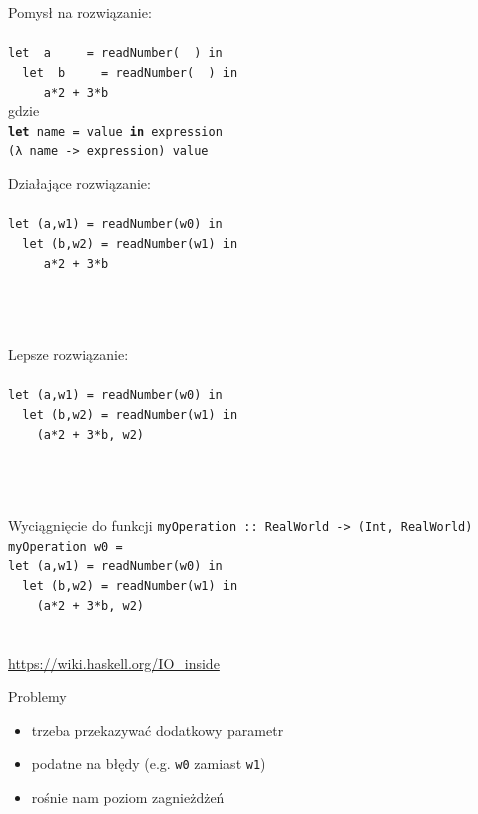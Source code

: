 \documentclass{beamer}
\begin{document}
\begin{frame}{Pomysł na rozwiązanie:}
  \texttt{ \\ \ \\
    let \ a\ \ \ \ \  = readNumber(\ \ ) in \\ \pause
    \ \ let \ b\ \ \ \ \ = readNumber(\ \ ) in \\ \pause
    \ \ \ \ \ a*2 + 3*b
  } \\ \pause gdzie \\
  \texttt{\textbf{let} name = value \textbf{in} expression} \\ 
  \texttt{(λ name -> expression) value}
\end{frame}


\begin{frame}{Działające rozwiązanie:}
  \texttt{ \\ \ \\
    let (a,w1) = readNumber(w0) in \\
    \ \ let (b,w2) = readNumber(w1) in \\
    \ \ \ \ \ a*2 + 3*b
  } \\ \ \\ \ \\ \ 
\end{frame}

\begin{frame}{Lepsze rozwiązanie:}
  \texttt{ \\ \ \\
    let (a,w1) = readNumber(w0) in \\
    \ \ let (b,w2) = readNumber(w1) in \\
    \ \ \ \ (a*2 + 3*b, w2)
  } \\ \ \\ \ \\ \ 
\end{frame}

\begin{frame}{Wyciągnięcie do funkcji}
  \texttt{myOperation ::\ RealWorld -> (Int, RealWorld)
    myOperation w0 = \\
    let (a,w1) = readNumber(w0) in \\
    \ \ let (b,w2) = readNumber(w1) in \\
    \ \ \ \ (a*2 + 3*b, w2)
  } \\ \ \\ \ \\ \url{https://wiki.haskell.org/IO_inside}
\end{frame}

\begin{frame}{Problemy}
  \pause
  \begin{itemize}
  \item trzeba przekazywać dodatkowy parametr \pause
  \item podatne na błędy (e.g. \texttt{w0} zamiast \texttt{w1}) \pause
  \item rośnie nam poziom zagnieżdżeń
  \end{itemize}
\end{frame}
\end{document}
